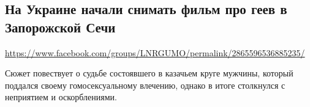  
 

\subsection{На Украине начали снимать фильм про геев в Запорожской Сечи}
\label{sec:21_07_2020.fb.lnr.3}
\url{https://www.facebook.com/groups/LNRGUMO/permalink/2865596536885235/}
  

Сюжет повествует о судьбе состоявшего в казачьем круге мужчины, который
поддался своему гомосексуальному влечению, однако в итоге столкнулся с
неприятием и оскорблениями.
